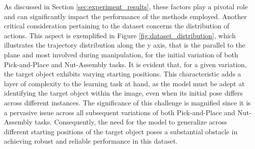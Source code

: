 As discussed in Section \ref{sec:experiment_results}, these factors play a pivotal role and can significantly impact the performance of the methods employed.
Another critical consideration pertaining to the dataset concerns the distribution of actions. This aspect is exemplified in Figure \ref{fig:dataset_distribution}, which illustrates the trajectory distribution along the y axis, that is the parallel to the plane and most involved during manipulation, for the initial variation of both Pick-and-Place and Nut-Assembly tasks. It is evident that, for a given variation, the target object exhibits varying starting positions. This characteristic adds a layer of complexity to the learning task at hand, as the model must be adept at identifying the target object within the image, even when its initial pose differs across different instances. The significance of this challenge is magnified since it is a pervasive issue across all subsequent variations of both Pick-and-Place and Nut-Assembly tasks. Consequently, the need for the model to generalize across different starting positions of the target object poses a substantial obstacle in achieving robust and reliable performance in this dataset.
\newpage

